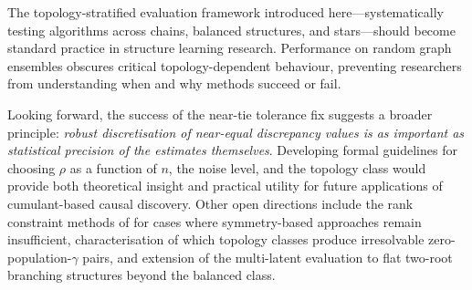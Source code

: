 \documentclass[11pt,a4paper]{article}
\numberwithin{equation}{section}
\begin{document}
The topology-stratified evaluation framework introduced here---systematically testing
algorithms across chains, balanced structures, and stars---should become standard
practice in structure learning research.  Performance on random graph ensembles obscures
critical topology-dependent behaviour, preventing researchers from understanding when
and why methods succeed or fail.

Looking forward, the success of the near-tie tolerance fix suggests a broader principle:
\emph{robust discretisation of near-equal discrepancy values is as important as
statistical precision of the estimates themselves}.  Developing formal guidelines for
choosing $\rho$ as a function of $n$, the noise level, and the topology class would
provide both theoretical insight and practical utility for future applications of
cumulant-based causal discovery.  Other open directions include the rank constraint
methods of \citet{cai:etal:2024:rank} for cases where symmetry-based approaches remain
insufficient, characterisation of which topology classes produce irresolvable zero-population-$\gamma$
pairs, and extension of the multi-latent evaluation to flat two-root branching structures
beyond the balanced class.


\end{document}
